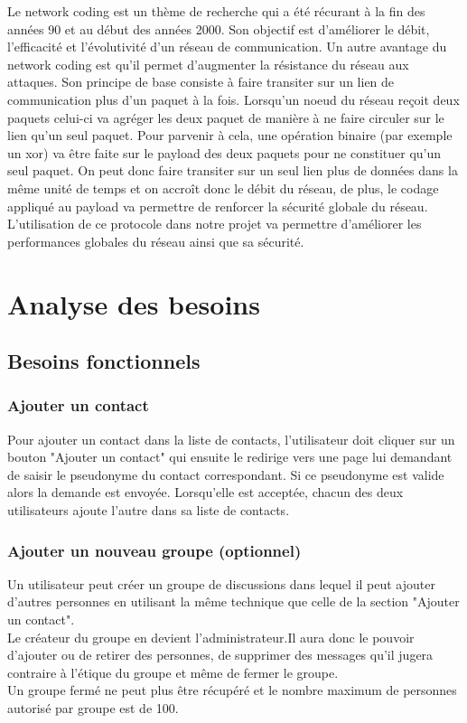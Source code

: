 \documentclass[a4paper, 12pt]{article}
\begin{document}
Le network coding est un thème de recherche qui a été récurant à la fin des années 90 et au début des années 2000. Son objectif est d'améliorer le débit, l'efficacité et l'évolutivité d'un réseau de communication. Un autre avantage du network coding est qu'il permet d'augmenter la résistance du réseau aux attaques. Son principe de base consiste à faire transiter sur un lien de communication plus d'un paquet à la fois. Lorsqu'un noeud du réseau reçoit deux paquets celui-ci va agréger les deux paquet de manière à ne faire circuler sur le lien qu'un seul paquet. Pour parvenir à cela, une opération binaire (par exemple un xor) va être faite sur le payload des deux paquets pour ne constituer qu'un seul paquet. On peut donc faire transiter sur un seul lien plus de données dans la même unité de temps et on accroît donc le débit du réseau, de plus, le codage appliqué au payload va permettre de renforcer la sécurité globale du réseau. L'utilisation de ce protocole dans notre projet va permettre d'améliorer les performances globales du réseau ainsi que sa sécurité.    

\section{Analyse des besoins}
    \subsection{Besoins fonctionnels}
        
        
        
        \subsubsection{Ajouter un contact}
        
         Pour ajouter un contact dans la liste de contacts, l'utilisateur doit cliquer sur un bouton "Ajouter un contact" qui ensuite le redirige vers une page lui demandant de   saisir le pseudonyme du contact correspondant.
         Si ce pseudonyme est valide alors la demande est envoyée. Lorsqu'elle est acceptée, chacun des deux utilisateurs  ajoute l'autre dans sa liste de contacts.
        \subsubsection{Ajouter un nouveau groupe (optionnel)}
        Un utilisateur peut créer un groupe de discussions dans lequel il peut ajouter d'autres personnes en utilisant la même technique que celle de la section "Ajouter un contact".\\
        Le créateur du groupe en devient l'administrateur.Il aura donc le pouvoir d'ajouter ou de retirer des personnes, de supprimer des messages qu'il jugera contraire à l'étique du groupe et même de fermer le groupe.\\
        Un groupe fermé ne peut plus être récupéré et le nombre maximum de personnes autorisé par groupe est de 100.
\end{document}

